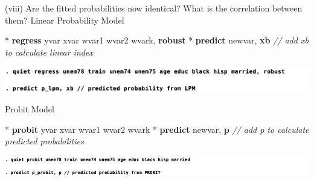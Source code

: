\documentclass[
  10pt,
  ignorenonframetext,
]{beamer}
\newenvironment{Shaded}{\begin{snugshade}}{\end{snugshade}}
\newcommand{\CommentTok}[1]{\textcolor[rgb]{0.56,0.35,0.01}{\textit{#1}}}
\newcommand{\KeywordTok}[1]{\textcolor[rgb]{0.13,0.29,0.53}{\textbf{#1}}}
\newcommand{\NormalTok}[1]{#1}
\begin{document}
\begin{frame}[fragile]{(viii) Are the fitted probabilities now
identical? What is the correlation between them?}
\protect\hypertarget{viii-are-the-fitted-probabilities-now-identical-what-is-the-correlation-between-them}{}
\normalsize Linear Probability Model \footnotesize

\begin{Shaded}
\begin{Highlighting}[]
\NormalTok{* }\KeywordTok{regress}\NormalTok{ yvar xvar wvar1 wvar2 wvark, }\KeywordTok{robust}
\NormalTok{* }\KeywordTok{predict}\NormalTok{ newvar, }\KeywordTok{xb} \CommentTok{// add \textquotesingle{}xb\textquotesingle{} to calculate linear index}
\end{Highlighting}
\end{Shaded}

\begin{center}\includegraphics[width=0.9\linewidth]{pictures/LMPwithcontrols_predict} \end{center}

\normalsize Probit Model \footnotesize

\begin{Shaded}
\begin{Highlighting}[]
\NormalTok{* }\KeywordTok{probit}\NormalTok{ yvar xvar wvar1 wvar2 wvark}
\NormalTok{* }\KeywordTok{predict}\NormalTok{ newvar, }\KeywordTok{p} \CommentTok{// add \textquotesingle{}p\textquotesingle{} to calculate predicted probabilities}
\end{Highlighting}
\end{Shaded}

\begin{center}\includegraphics[width=1\linewidth]{pictures/PROBITwithcontrols_predict} \end{center}
\end{frame}
\end{document}
